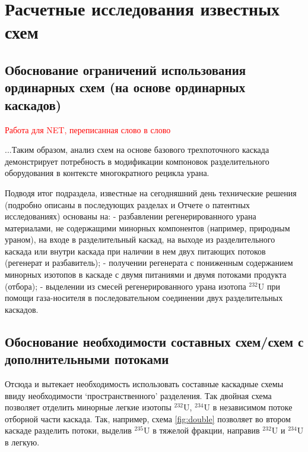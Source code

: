 \chapter{Расчетные исследования известных схем}\label{ch:ch2}

\section{Обоснование ограничений использования ординарных схем (на основе ординарных каскадов)}\label{sec:ch2/sec1}

\textcolor{red}{Работа для NET, переписанная слово в слово}

...Таким образом, анализ схем на основе базового трехпоточного каскада демонстрирует потребность в модификации компоновок разделительного оборудования в контексте многократного рецикла урана.

Подводя итог подраздела, известные на сегодняшний день  технические решения (подробно описаны в последующих разделах и Отчете о патентных исследованиях) основаны на:
-	разбавлении регенерированного урана материалами, не содержащими минорных компонентов (например, природным ураном), на входе в разделительный каскад, на выходе из разделительного каскада или внутри каскада при наличии в нем двух питающих потоков (регенерат и разбавитель);
-	получении регенерата с пониженным содержанием минорных изотопов в каскаде с двумя питаниями и двумя потоками продукта (отбора);
-	выделении из смесей регенерированного урана изотопа $^{232}$U при помощи газа-носителя в последовательном соединении двух разделительных каскадов.

\section{Обоснование необходимости составных схем/схем с дополнительными потоками}\label{sec:ch2/sec2}
Отсюда и вытекает необходимость использовать составные каскадные схемы ввиду необходимости  `пространственного' разделения. Так двойная схема позволяет отделить минорные легкие изотопы $^{232}$U, $^{234}$U в независимом потоке отборной части каскада. Так, например, схема \ref{fig:double} позволяет во втором каскаде разделить потоки, выделив $^{235}$U в тяжелой фракции, направив $^{232}$U и $^{234}$U в легкую.

